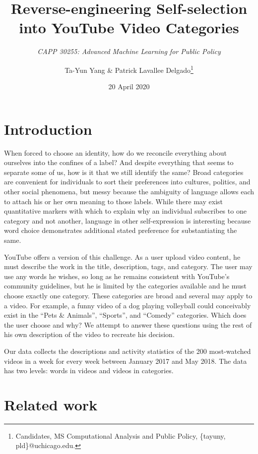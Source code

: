 \documentclass[letterpaper, 12pt]{article}
\title{Reverse-engineering Self-selection into YouTube Video Categories}
\subtitle{\textit{CAPP 30255: Advanced Machine Learning for Public Policy}}
\author{Ta-Yun Yang \& Patrick Lavallee Delgado\thanks{Candidates, MS Computational Analysis and Public Policy, \{tayuny, pld\}@uchicago.edu.}}
\date{20 April 2020}
\begin{document}
\maketitle

\section{Introduction}

When forced to choose an identity, how do we reconcile everything about ourselves into the confines of a label? And despite everything that seems to separate some of us, how is it that we still identify the same? Broad categories are convenient for individuals to sort their preferences into cultures, politics, and other social phenomena, but messy because the ambiguity of language allows each to attach his or her own meaning to those labels. While there may exist quantitative markers with which to explain why an individual subscribes to one category and not another, language in other self-expression is interesting because word choice demonstrates additional stated preference for substantiating the same.

YouTube offers a version of this challenge. As a user upload video content, he must describe the work in the title, description, tags, and category. The user may use any words he wishes, so long as he remains consistent with YouTube's community guidelines, but he is limited by the categories available and he must choose exactly one category. These categories are broad and several may apply to a video. For example, a funny video of a dog playing volleyball could conceivably exist in the ``Pets \& Animals'', ``Sports'', and ``Comedy'' categories. Which does the user choose and why? We attempt to answer these questions using the rest of his own description of the video to recreate his decision.

Our data collects the descriptions and activity statistics of the 200 most-watched videos in a week for every week between January 2017 and May 2018. The data has two levels: words in videos and videos in categories.

\section{Related work}
\end{document}
